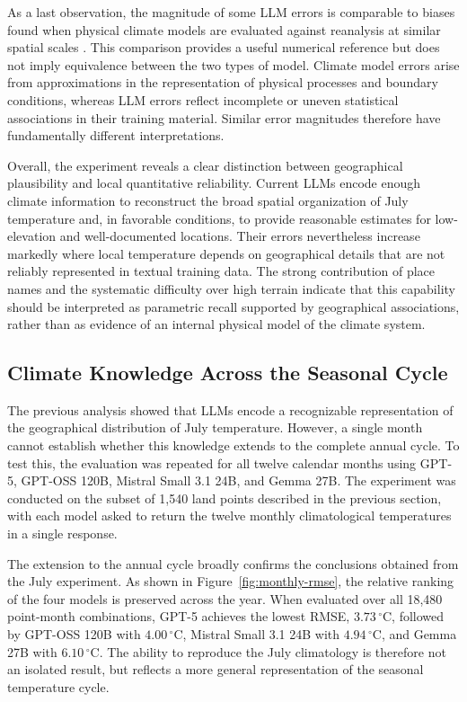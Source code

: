 As a last observation, the magnitude of some LLM errors is comparable to biases found when physical climate models are evaluated against reanalysis at similar spatial scales \citep{eyring_overview_2016}. This comparison provides a useful numerical reference but does not imply equivalence between the two types of model. Climate model errors arise from approximations in the representation of physical processes and boundary conditions, whereas LLM errors reflect incomplete or uneven statistical associations in their training material. Similar error magnitudes therefore have fundamentally different interpretations.




Overall, the experiment reveals a clear distinction between geographical plausibility and local quantitative reliability. Current LLMs encode enough climate information to reconstruct the broad spatial organization of July temperature and, in favorable conditions, to provide reasonable estimates for low-elevation and well-documented locations. Their errors nevertheless increase markedly where local temperature depends on geographical details that are not reliably represented in textual training data. The strong contribution of place names and the systematic difficulty over high terrain indicate that this capability should be interpreted as parametric recall supported by geographical associations, rather than as evidence of an internal physical model of the climate system.

\subsection{Climate Knowledge Across the Seasonal Cycle}

The previous analysis showed that LLMs encode a recognizable representation of the geographical distribution of July temperature. However, a single month cannot establish whether this knowledge extends to the complete annual cycle. To test this, the evaluation was repeated for all twelve calendar months using GPT-5, GPT-OSS 120B, Mistral Small 3.1 24B, and Gemma 27B. The experiment was conducted on the subset of 1,540 land points described in the previous section, with each model asked to return the twelve monthly climatological temperatures in a single response.

The extension to the annual cycle broadly confirms the conclusions obtained from the July experiment. As shown in Figure~\ref{fig:monthly-rmse}, the relative ranking of the four models is preserved across the year. When evaluated over all 18,480 point-month combinations, GPT-5 achieves the lowest RMSE, \(3.73\,^{\circ}\mathrm{C}\), followed by GPT-OSS 120B with \(4.00\,^{\circ}\mathrm{C}\), Mistral Small 3.1 24B with \(4.94\,^{\circ}\mathrm{C}\), and Gemma 27B with \(6.10\,^{\circ}\mathrm{C}\). The ability to reproduce the July climatology is therefore not an isolated result, but reflects a more general representation of the seasonal temperature cycle.

